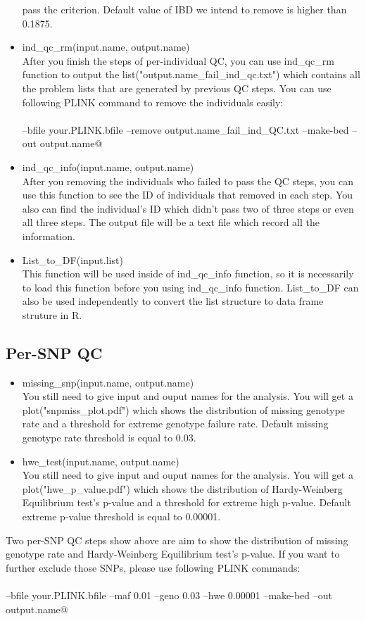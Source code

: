 \documentclass{article}
\begin{document}
\begin{itemize}
    pass the criterion. Default value of IBD we intend to remove is higher than 0.1875.
    \item ind\_qc\_rm(input.name, output.name) \\
    After you finish the steps of per-individual QC, you can use ind\_qc\_rm function to output the list("output.name\_fail\_ind\_qc.txt") which contains 
    all the problem lists that are generated by previous QC steps. You can use following PLINK command to remove the individuals easily:\\
    \\\verb@plink --bfile your.PLINK.bfile --remove output.name_fail_ind_QC.txt --make-bed --out output.name@
    \item ind\_qc\_info(input.name, output.name) \\
    After you removing the individuals who failed to pass the QC steps, you can use this function to see the ID of individuals that removed in each step. 
    You also can find the individual's ID which didn't pass two of three steps or even all three steps. The output file will be a text file which record 
    all the information.
    \item List\_to\_DF(input.list) \\
    This function will be used inside of ind\_qc\_info function, so it is necessarily to load this function before you using ind\_qc\_info function. 
    List\_to\_DF can also be used independently to convert the list structure to data frame struture in R.
\end{itemize}
\subsection{Per-SNP QC}
\begin{itemize}
    \item missing\_snp(input.name, output.name) \\
    You still need to give input and ouput names for the analysis. You will get a plot("snpmiss\_plot.pdf") which shows the distribution of 
    missing genotype rate and a threshold for extreme genotype failure rate. Default missing genotype rate threshold is equal to 0.03.
    \item hwe\_test(input.name, output.name) \\
    You still need to give input and ouput names for the analysis. You will get a plot("hwe\_p\_value.pdf") which shows the distribution of 
    Hardy-Weinberg Equilibrium test's p-value and a threshold for extreme high p-value. Default extreme p-value threshold is equal to 0.00001.
\end{itemize}
Two per-SNP QC steps show above are aim to show the distribution of missing genotype rate and Hardy-Weinberg Equilibrium test's p-value. If you want to 
further exclude those SNPs, please use following PLINK commands:\\
\\\verb@plink --bfile your.PLINK.bfile --maf 0.01 --geno 0.03 --hwe 0.00001 --make-bed --out output.name@
\newpage
\end{document}
